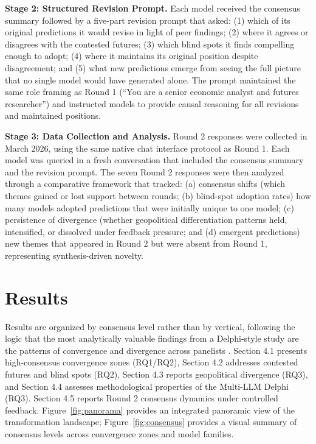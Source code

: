 \documentclass[preprint,review,12pt]{elsarticle}
\begin{document}
\textbf{Stage 2: Structured Revision Prompt.} Each model received the consensus summary followed by a five-part revision prompt that asked: (1) which of its original predictions it would revise in light of peer findings; (2) where it agrees or disagrees with the contested futures; (3) which blind spots it finds compelling enough to adopt; (4) where it maintains its original position despite disagreement; and (5) what new predictions emerge from seeing the full picture that no single model would have generated alone. The prompt maintained the same role framing as Round 1 (``You are a senior economic analyst and futures researcher'') and instructed models to provide causal reasoning for all revisions and maintained positions.

\textbf{Stage 3: Data Collection and Analysis.} Round 2 responses were collected in March 2026, using the same native chat interface protocol as Round 1. Each model was queried in a fresh conversation that included the consensus summary and the revision prompt. The seven Round 2 responses were then analyzed through a comparative framework that tracked: (a) consensus shifts (which themes gained or lost support between rounds; (b) blind-spot adoption rates) how many models adopted predictions that were initially unique to one model; (c) persistence of divergence (whether geopolitical differentiation patterns held, intensified, or dissolved under feedback pressure; and (d) emergent predictions) new themes that appeared in Round 2 but were absent from Round 1, representing synthesis-driven novelty.


\section{Results}
\label{sec:results}

Results are organized by consensus level rather than by vertical, following the logic that the most analytically valuable findings from a Delphi-style study are the patterns of convergence and divergence across panelists \citep{vondergracht2012delphi}. Section 4.1 presents high-consensus convergence zones (RQ1/RQ2), Section 4.2 addresses contested futures and blind spots (RQ2), Section 4.3 reports geopolitical divergence (RQ3), and Section 4.4 assesses methodological properties of the Multi-LLM Delphi (RQ3). Section 4.5 reports Round 2 consensus dynamics under controlled feedback. Figure~\ref{fig:panorama} provides an integrated panoramic view of the transformation landscape; Figure~\ref{fig:consensus} provides a visual summary of consensus levels across convergence zones and model families.
\end{document}
